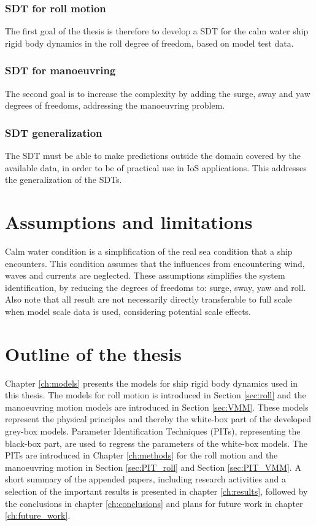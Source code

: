 \subsubsection*{SDT for roll motion}
The first goal of the thesis is therefore to develop a SDT for the calm water ship rigid body dynamics in the roll degree of freedom, based on model test data.

\subsubsection*{SDT for manoeuvring}
The second goal is to increase the complexity by adding the surge, sway and yaw degrees of freedoms, addressing the manoeuvring problem.

\subsubsection*{SDT generalization}
The SDT must be able to make predictions outside the domain covered by the available data, in order to be of practical use in IoS applications. This addresses the generalization of the SDTs.

\section{Assumptions and limitations}
Calm water condition is a simplification of the real sea condition that a ship encounters. This condition assumes that the influences from encountering wind, waves and currents are neglected. These assumptions simplifies the system identification, by reducing the degrees of freedoms to: surge, sway, yaw and roll. Also note that all result are not necessarily directly transferable to full scale when model scale data is used, considering potential scale effects. 

\section{Outline of the thesis}
Chapter \ref{ch:models} presents the models for ship rigid body dynamics used in this thesis. The models for roll motion is introduced in Section \ref{sec:roll} and the manoeuvring motion models are introduced in Section \ref{sec:VMM}. These models represent the physical principles and thereby the white-box part of the developed grey-box models.
Parameter Identification Techniques (PITs), representing the black-box part, are used to regress the parameters of the white-box models. The PITs are introduced in Chapter \ref{ch:methods} for the roll motion and the manoeuvring motion in Section \ref{sec:PIT_roll} and Section \ref{sec:PIT_VMM}. 
A short summary of the appended papers, including research activities and a selection of the important results is presented in chapter \ref{ch:results}, followed by the conclusions in chapter \ref{ch:conclusions} and plans for future work in chapter \ref{ch:future_work}.